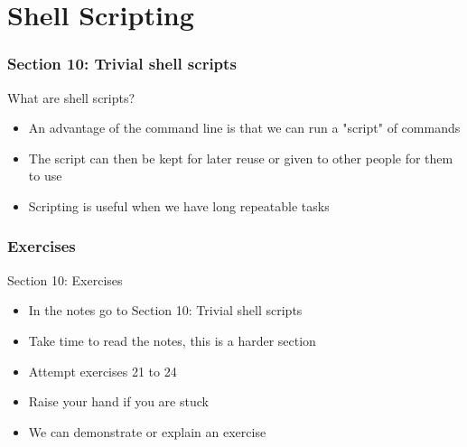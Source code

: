 \part{Shell Scripting}
\begin{frame}
\partpage
\end{frame}

\section{Section 10: Trivial shell scripts}
\begin{frame}{What are shell scripts?}
\begin{itemize}
\item An advantage of the command line is that we can run a "script" of commands
\item The script can then be kept for later reuse or given to other people for them to use
\item Scripting is useful when we have long repeatable tasks
\end{itemize}
\end{frame}

\section{Exercises}
\begin{frame}{Section 10: Exercises}
\begin{itemize}
\item In the notes go to {Section 10: Trivial shell scripts}
\item Take time to read the notes, this is a harder section 
\item Attempt exercises 21 to 24
\item Raise your hand if you are stuck
\item We can demonstrate or explain an exercise
\end{itemize}
\end{frame}

